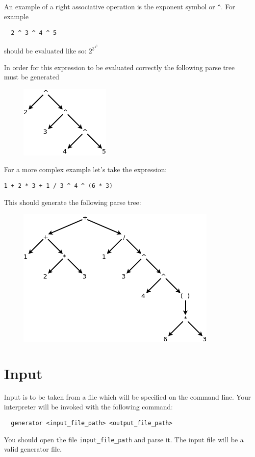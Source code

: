 \documentclass{article}
\newcommand{\code}[1]{\texttt{\textmd{#1}}}
\begin{document}
An example of a right associative operation is the exponent symbol or \code{\textasciicircum}.
For example
\begin{lstlisting}
  2 ^ 3 ^ 4 ^ 5
\end{lstlisting}

should be evaluated like so:
\begin{math}
  2 ^ {\displaystyle 3 ^ {\displaystyle 4 ^ {\displaystyle 5 }}}
\end{math}

In order for this expression to be evaluated correctly the following parse tree must be generated
\begin{figure}[H]
  \centering
  \includegraphics{static/right-assoc-pow.png}
\end{figure}

For a more complex example let's take the expression:
\begin{lstlisting}
1 + 2 * 3 + 1 / 3 ^ 4 ^ (6 * 3)
\end{lstlisting}

This should generate the following parse tree:
\begin{figure}[H]
  \centering
  \includegraphics{static/assoc-example.png}
\end{figure}

\section{Input}
Input is to be taken from a file which will be specified on the command line. Your interpreter
will be invoked with the following command:
\begin{lstlisting}
  generator <input_file_path> <output_file_path>
\end{lstlisting}
You should open the file \code{input\_file\_path} and parse it. The input file will be a valid
generator file.
\end{document}

